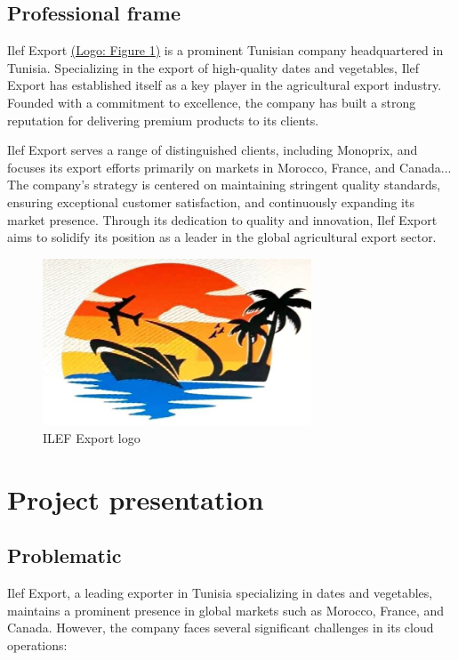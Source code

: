 \subsection{Professional frame}

Ilef Export \hyperref[fig:ilef_logo]{(Logo: Figure \ref{fig:ilef_logo})} is a prominent Tunisian company headquartered in Tunisia. Specializing in the export of high-quality dates and vegetables, Ilef Export has established itself as a key player in the agricultural export industry. Founded with a commitment to excellence, the company has built a strong reputation for delivering premium products to its clients.

Ilef Export serves a range of distinguished clients, including Monoprix, and focuses its export efforts primarily on markets in Morocco, France, and Canada... The company's strategy is centered on maintaining stringent quality standards, ensuring exceptional customer satisfaction, and continuously expanding its market presence.
Through its dedication to quality and innovation, Ilef Export aims to solidify its position as a leader in the global agricultural export sector.

\begin{figure}[htbp]
  \centering  %
  \includegraphics[width=8cm]{./chapters/overview/ilef_logo.png}
  \caption{ILEF Export logo}
  \label{fig:ilef_logo}
\end{figure}



\section{Project presentation}
\subsection{Problematic}
Ilef Export, a leading exporter in Tunisia specializing in dates and vegetables, maintains a prominent presence in global markets such as Morocco, France, and Canada. However, the company faces several significant challenges in its cloud operations:

